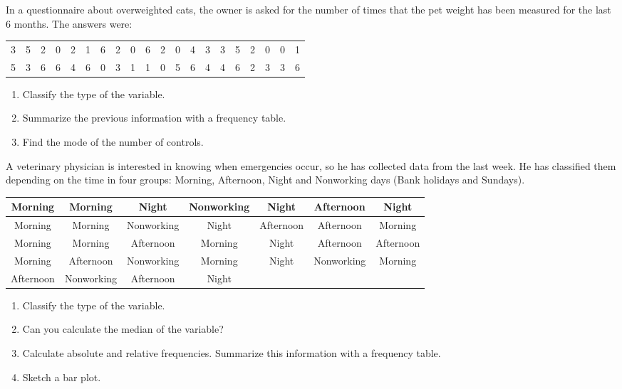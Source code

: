 \begin{problem}
  In a questionnaire about overweighted cats, the owner is asked for
  the number of times that the pet weight has been measured for the
  last 6 months. The answers  were: 

  \begin{center}
    \begin{tabular}{*{20}{c}}
      3& 5 & 2 & 0 & 2 & 1 & 6 & 2 & 0 & 6 & 2 & 0 & 4 & 3 & 3 & 5 & 2
      & 0 & 0 & 1 \\ 
5 & 3 & 6 & 6 & 4 & 6 & 0 & 3 & 1 & 1  & 0 & 5 & 6 & 4 & 4 & 6 & 2 & 3 &
3 & 6
    \end{tabular}
  \end{center}

  \begin{enumerate} \renewcommand{\theenumi}{\alph{enumi}}
  \item Classify the type of the variable.
  \item Summarize the previous information with a frequency table. 
  \item Find the mode of the number of controls. 
  \end{enumerate}
\end{problem}

\begin{problem}
A veterinary physician is interested in knowing  when emergencies
occur, so he has collected data from the last week. He has
classified them depending on the time in four groups: Morning, Afternoon,
Night and Nonworking days (Bank holidays and Sundays).
\begin{center}
\begin{tabular}{|*{7}{c|}}
\hline   Morning &Morning & Night &Nonworking & Night  & Afternoon & Night  \\ 	
\hline   Morning & Morning& Nonworking &  Night  &Afternoon & Afternoon&Morning \\ 	
\hline   Morning & Morning&Afternoon &Morning & Night  & Afternoon& Afternoon\\ 	
\hline   Morning & Afternoon &Nonworking &Morning & Night  & Nonworking&Morning \\ 	
\hline   Afternoon & Nonworking&Afternoon & Night  & & & \\ 	
\hline
\end{tabular}
  
\end{center}

\begin{enumerate} \renewcommand{\theenumi}{\alph{enumi}}
\item Classify the type of the variable.
\item Can you calculate the median of the variable?
\item Calculate absolute and relative frequencies. Summarize this information with a frequency table. 
\item Sketch a bar plot. 
\end{enumerate}
 
\end{problem}

